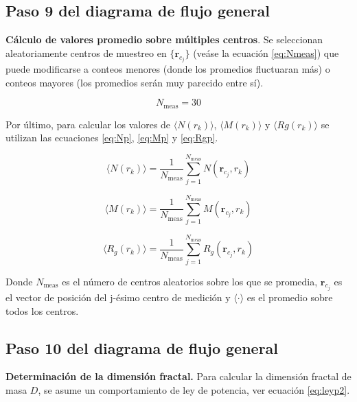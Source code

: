 	 	
 	\subsection{Paso 9 del diagrama de flujo general}
 		\label{subsec:paso9}
 	
 	\textbf{C\'{a}lculo de valores promedio sobre m\'{u}ltiples centros}. Se seleccionan aleatoriamente centros de muestreo en $\{\mathbf{r}_{c_j}\}$ (ve\'{a}se la ecuaci\'{o}n \ref{eq:Nmeas}) que puede modificarse a conteos menores (donde los promedios fluctuaran m\'{a}s) o conteos mayores (los promedios ser\'{a}n muy parecido entre s\'{i}). 
 	
 	
 	\begin{equation}
 		N_{\text{meas}} = 30  
 		\label{eq:Nmeas}
 	\end{equation}
 	
 	Por \'{u}ltimo, para calcular los valores de $\langle N(r_k) \rangle$, $\langle M(r_k) \rangle$ y $\langle Rg(r_k) \rangle$ se utilizan las ecuaciones \ref{eq:Np}, \ref{eq:Mp} y \ref{eq:Rgp}.
 	
 	\begin{equation}
 		\langle N(r_k) \rangle = \frac{1}{N_{\text{meas}}} 
 		\sum_{j=1}^{N_{\text{meas}}} N(\mathbf{r}_{c_j}, r_k)
 		\label{eq:Np}
 	\end{equation}
 	
 	\begin{equation}
 		\langle M(r_k) \rangle = \frac{1}{N_{\text{meas}}} 
 		\sum_{j=1}^{N_{\text{meas}}} M(\mathbf{r}_{c_j}, r_k)
 		\label{eq:Mp}
 	\end{equation}
 	
 	\begin{equation}
 		\langle R_g(r_k) \rangle = \frac{1}{N_{\text{meas}}} 
 		\sum_{j=1}^{N_{\text{meas}}} R_g(\mathbf{r}_{c_j}, r_k)
 		\label{eq:Rgp}
 	\end{equation}
 	
 	Donde $	N_{\text{meas}}$ es el n\'{u}mero de centros aleatorios sobre los que se promedia,
 	$\mathbf{r}_{c_j}$ es el vector de posici\'{o}n del j-\'{e}simo centro de medici\'{o}n y
 	$\langle\cdot\rangle$ es el promedio sobre todos los centros.	

 	
 	\subsection{Paso 10 del diagrama de flujo general}
 	\label{subsec:paso10}
 	
 	\textbf{Determinaci\'{o}n de la dimensi\'{o}n fractal.}	 
 	Para calcular la dimensi\'{o}n fractal de masa $D$, 
 	se asume un comportamiento de ley de potencia, 
 	ver ecuaci\'{o}n \ref{eq:leyp2}.
 	
